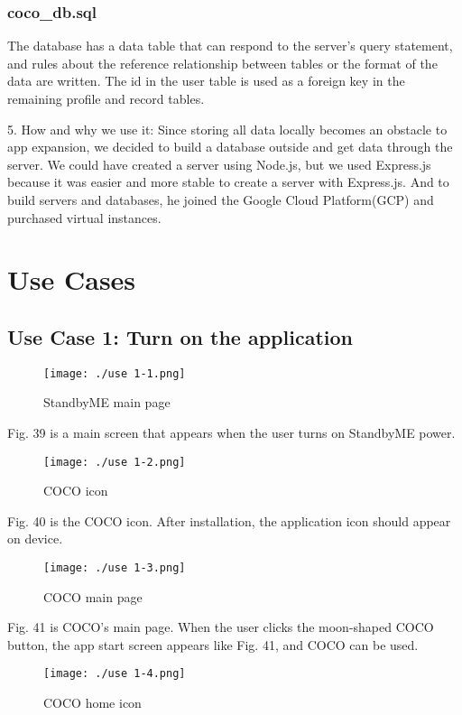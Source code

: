 \documentclass[conference]{IEEEtran}
\begin{document}
\subsubsection{coco\_db.sql}
The database has a data table that can respond to the server's query statement, and rules about the reference relationship between tables or the format of the data are written. The id in the user table is used as a foreign key in the remaining profile and record tables.\break
\par 5. How and why we use it: Since storing all data locally becomes an obstacle to app expansion, we decided to build a database outside and get data through the server. We could have created a server using Node.js, but we used Express.js because it was easier and more stable to create a server with Express.js. And to build servers and databases, he joined the Google Cloud Platform(GCP) and purchased virtual instances.
\break

\section{Use Cases}
\subsection{Use Case 1: Turn on the application}

\begin{figure}[H]
\texttt{[image: ./use 1-1.png]}
\centering
\caption{StandbyME main page}
\end{figure}

Fig. 39 is a main screen that appears when the user turns on StandbyME power.

\begin{figure}[H]
\texttt{[image: ./use 1-2.png]}
\centering
\caption{COCO icon}
\end{figure}

Fig. 40 is the COCO icon. After installation, the application icon should appear on device.

\begin{figure}[H]
\texttt{[image: ./use 1-3.png]}
\centering
\caption{COCO main page}
\end{figure}

Fig. 41 is COCO's main page. When the user clicks the moon-shaped COCO button, the app start screen appears like Fig. 41, and COCO can be used.

\begin{figure}[H]
\texttt{[image: ./use 1-4.png]}
\centering
\caption{COCO home icon}
\end{figure}
\end{document}
